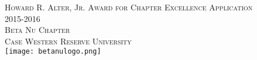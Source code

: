 \documentclass[oneside,openany]{book}
\begin{document}
  \begin{titlepage}
    \begin{center}
      \textsc{\Huge Howard R. Alter, Jr. Award for Chapter Excellence Application } \\[0.5cm]
      \textsc{\Huge 2015-2016} \\[1.0cm]
      \textsc{\Large Beta Nu Chapter} \\[0.3cm]
      \textsc{\Large Case Western Reserve University} \\[1.5cm]
      \texttt{[image: betanulogo.png]}
    \end{center}
  \end{titlepage}

  \tableofcontents

  \frontmatter
    

  \mainmatter
    
    
    
    
    
    
    
    
    
    
    
    
    
\end{document}
